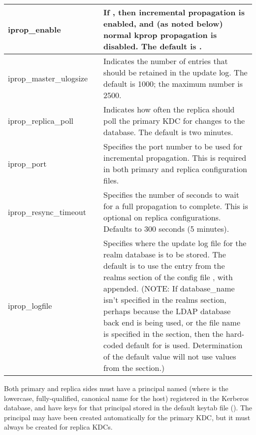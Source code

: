 \documentclass[letterpaper,10pt,english]{sphinxmanual}
\begin{document}
\begin{savenotes}\sphinxattablestart
\centering
\begin{tabulary}{\linewidth}[t]{|T|T|T|}
\hline

iprop\_enable
&
&
If , then incremental propagation is enabled, and (as noted below) normal kprop propagation is disabled. The default is .
\\
\hline
iprop\_master\_ulogsize
&
&
Indicates the number of entries that should be retained in the update log. The default is 1000; the maximum number is 2500.
\\
\hline
iprop\_replica\_poll
&
&
Indicates how often the replica should poll the primary KDC for changes to the database. The default is two minutes.
\\
\hline
iprop\_port
&
&
Specifies the port number to be used for incremental propagation. This is required in both primary and replica configuration files.
\\
\hline
iprop\_resync\_timeout
&
&
Specifies the number of seconds to wait for a full propagation to complete. This is optional on replica configurations.  Defaults to 300 seconds (5 minutes).
\\
\hline
iprop\_logfile
&
&
Specifies where the update log file for the realm database is to be stored. The default is to use the  entry from the realms section of the config file {\hyperref[\detokenize{admin/conf_files/kdc_conf:kdc-conf-5}]{}}, with  appended. (NOTE: If database\_name isn’t specified in the realms section, perhaps because the LDAP database back end is being used, or the file name is specified in the  section, then the hard-coded default for  is used. Determination of the   default value will not use values from the  section.)
\\
\hline
\end{tabulary}
\par
\sphinxattableend\end{savenotes}

Both primary and replica sides must have a principal named
 (where  is the lowercase,
fully-qualified, canonical name for the host) registered in the
Kerberos database, and have keys for that principal stored in the
default keytab file ({\hyperref[\detokenize{mitK5defaults:paths}]{}}).  The  principal may
have been created automatically for the primary KDC, but it must
always be created for replica KDCs.
\end{document}
